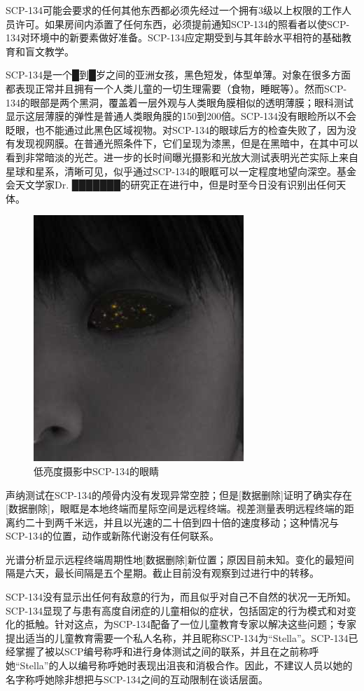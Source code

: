 SCP-134可能会要求的任何其他东西都必须先经过一个拥有3级以上权限的工作人员许可。如果房间内添置了任何东西，必须提前通知SCP-134的照看者以使SCP-134对环境中的新要素做好准备。SCP-134应定期受到与其年龄水平相符的基础教育和盲文教学。

SCP-134是一个█到█岁之间的亚洲女孩，黑色短发，体型单薄。对象在很多方面都表现正常并且拥有一个人类儿童的一切生理需要（食物，睡眠等）。然而SCP-134的眼部是两个黑洞，覆盖着一层外观与人类眼角膜相似的透明薄膜；眼科测试显示这层薄膜的弹性是普通人类眼角膜的150到200倍。SCP-134没有眼睑所以不会眨眼，也不能通过此黑色区域视物。对SCP-134的眼球后方的检查失败了，因为没有发现视网膜。在普通光照条件下，它们呈现为漆黑，但是在黑暗中，在其中可以看到非常暗淡的光芒。进一步的长时间曝光摄影和光放大测试表明光芒实际上来自星球和星系，清晰可见，似乎通过SCP-134的眼眶可以一定程度地望向深空。基金会天文学家Dr. ███████的研究正在进行中，但是时至今日没有识别出任何天体。

\begin{figure}[H]
    \centering
    \includegraphics[width=0.35\linewidth]{images/SCP.134.2.jpg}
    \caption*{低亮度摄影中SCP-134的眼睛}
\end{figure}

声纳测试在SCP-134的颅骨内没有发现异常空腔；但是{[}数据删除]证明了确实存在{[}数据删除]，眼眶是本地终端而星际空间是远程终端。视差测量表明远程终端的距离约二十到两千米远，并且以光速的二十倍到四十倍的速度移动；这种情况与SCP-134的位置，动作或新陈代谢没有任何联系。

光谱分析显示远程终端周期性地{[}数据删除]新位置；原因目前未知。变化的最短间隔是六天，最长间隔是五个星期。截止目前没有观察到过进行中的转移。

SCP-134没有显示出任何有敌意的行为，而且似乎对自己不自然的状况一无所知。SCP-134显现了与患有高度自闭症的儿童相似的症状，包括固定的行为模式和对变化的抵触。针对这点，为SCP-134配备了一位儿童教育专家以解决这些问题；专家提出适当的儿童教育需要一个私人名称，并且昵称SCP-134为“Stella”。SCP-134已经掌握了被以SCP编号称呼和进行身体测试之间的联系，并且在之前称呼她“Stella”的人以编号称呼她时表现出沮丧和消极合作。因此，不建议人员以她的名字称呼她除非想把与SCP-134之间的互动限制在谈话层面。

